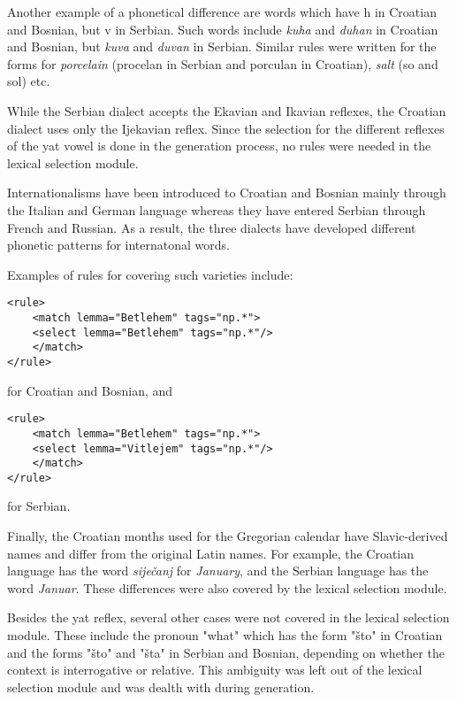 Another example of a phonetical difference are words which have h in Croatian and Bosnian, but v in Serbian.
Such words include \emph{kuha} and \emph{duhan} in Croatian and Bosnian, but \emph{kuva} and \emph{duvan} in Serbian.
Similar rules were written for the forms for \emph{porcelain} (procelan in Serbian and porculan in Croatian), 
\emph{salt} (so and sol) etc.

While the Serbian dialect accepts the Ekavian and Ikavian reflexes, 
the Croatian dialect uses only the Ijekavian reflex.
Since the selection for the different reflexes of the yat vowel is done in the generation process,
no rules were needed in the lexical selection module.

Internationalisms have been introduced to Croatian and Bosnian mainly through the Italian and German language
whereas they have entered Serbian through French and Russian. 
As a result, the three dialects have developed different phonetic patterns for internatonal words.

Examples of rules for covering such varieties include:
{\small
\begin{Verbatim}
<rule>
    <match lemma="Betlehem" tags="np.*">
	<select lemma="Betlehem" tags="np.*"/>
    </match>
</rule>
\end{Verbatim}
}
for Croatian and Bosnian, and
{\small
\begin{Verbatim}
<rule>
    <match lemma="Betlehem" tags="np.*">
	<select lemma="Vitlejem" tags="np.*"/>
    </match>
</rule>
\end{Verbatim}
}
for Serbian.

Finally, the Croatian months used for the Gregorian calendar have Slavic-derived names and differ from the original Latin names.
For example, the Croatian language has the word \emph{siječanj} for \emph{January}, and 
the Serbian language has the word \emph{Januar}.
These differences were also covered by the lexical selection module.

Besides the yat reflex, several other cases were not covered in the lexical selection module. These include the pronoun "what" which has the form "što" in Croatian and the forms "što" and "šta" in Serbian and Bosnian, depending on whether the context is interrogative or relative. This ambiguity was left out of the lexical selection module and was dealth with during generation.


